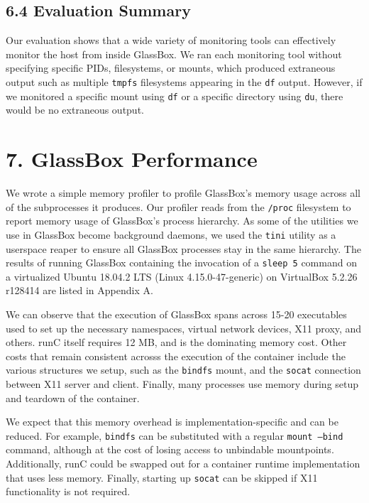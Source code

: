 \documentclass{proc}
\begin{document}
\subsection*{6.4 Evaluation Summary}

Our evaluation shows that a wide variety of monitoring tools can effectively monitor the host from inside GlassBox. We ran each monitoring tool without specifying specific PIDs, filesystems, or mounts, which produced extraneous output such as multiple \texttt{tmpfs} filesystems appearing in the \texttt{df} output. However, if we monitored a specific mount using  \texttt{df} or a specific directory using \texttt{du}, there would be no extraneous output.

\section*{7. GlassBox Performance}

We wrote a simple memory profiler to profile GlassBox's memory usage across all of the subprocesses it produces. Our profiler reads from the \texttt{/proc} filesystem to report memory usage of GlassBox's process hierarchy. As some of the utilities we use in GlassBox become background daemons, we used the \texttt{tini} utility \cite{tinigithub} as a userspace reaper to ensure all GlassBox processes stay in the same hierarchy. The results of running GlassBox containing the invocation of a \texttt{sleep 5} command on a virtualized Ubuntu 18.04.2 LTS (Linux 4.15.0-47-generic) on VirtualBox 5.2.26 r128414 are listed in Appendix A.

We can observe that the execution of GlassBox spans across 15-20 executables used to set up the necessary namespaces, virtual network devices, X11 proxy, and others. runC itself requires 12 MB, and is the dominating memory cost. Other costs that remain consistent acrosss the execution of the container include the various structures we setup, such as the \texttt{bindfs} mount, and the \texttt{socat} connection between X11 server and client. Finally, many processes use memory during setup and teardown of the container.

We expect that this memory overhead is implementation-specific and can be reduced. For example, \texttt{bindfs} can be substituted with a regular \texttt{mount --bind} command, although at the cost of losing access to unbindable mountpoints. Additionally, runC could be swapped out for a container runtime implementation that uses less memory. Finally, starting up \texttt{socat} can be skipped if X11 functionality is not required.
\end{document}
